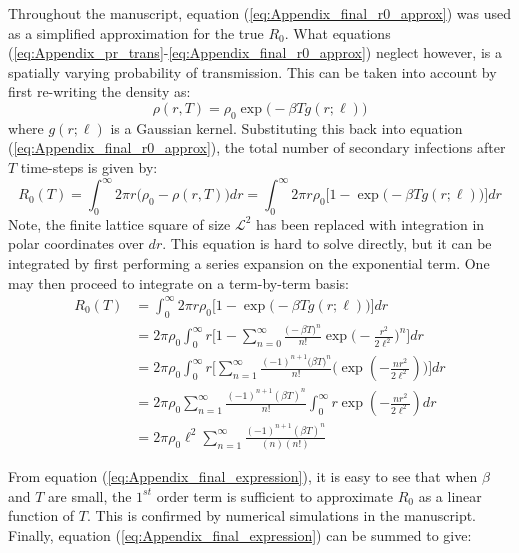 \begin{fi}
Throughout the manuscript, equation (\ref{eq:Appendix_final_r0_approx}) was used as a simplified approximation for the true $R_0$. What equations (\ref{eq:Appendix_pr_trans}-\ref{eq:Appendix_final_r0_approx}) neglect however, is a spatially varying probability of transmission. This can be taken into account by first re-writing the density as:
\begin{equation}
    \rho(r, T) = \rho_0\exp \big( -\beta T g(r; \ell) \big)
\end{equation}
where $g(r;\ell)$ is a Gaussian kernel. Substituting this back into equation (\ref{eq:Appendix_final_r0_approx}), the total number of secondary infections after $T$ time-steps is given by:
\begin{equation}
   R_0(T) = \int ^\infty _0 2\pi r \big (\rho_0 - \rho(r, T)\big)dr =  \int ^\infty _0 2\pi r \rho_0 \Big[1 - \exp\big(-\beta T g(r;\ell)\big) \Big]dr
\end{equation}
Note, the finite lattice square of size $\mathcal{L}^2$ has been replaced with integration in polar coordinates over $dr$. This equation is hard to solve directly, but it can be integrated by first performing a series expansion on the exponential term. One may then proceed to integrate on a term-by-term basis:
\begin{equation} \label{eq:Appendix_final_expression}
\begin{split}
R_0(T) & = \int^\infty_0 2\pi r \rho_0 \Big[1 - \exp \big( -\beta T g(r;\ell)\big)\Big]dr \\
& = 2\pi\rho_0 \int^\infty _0 r \Big[1 - \sum^\infty_{n=0} \frac{\big(-\beta T)^n}{n!} \exp\big(-\frac{r^2}{2\ell^2}\big)^n  \Big] dr \\
& = 2\pi\rho_0 \int^\infty _0 r \Big[\sum^\infty_{n=1} \frac{(-1)^{n+1}\big(\beta T)^n}{n!} \Big(\exp(-\frac{n r^2}{2\ell^2} ) \Big)  \Big] dr \\
& = 2\pi\rho_0 \sum^{\infty}_{n=1} \frac{(-1)^{n+1} (\beta T)^n}{n!} \int^\infty _0 r \exp(-\frac{n r^2}{2\ell^2})dr  \\
& = 2\pi\rho_0 \ell^2 \sum^{\infty}_{n=1} \frac{(-1)^{n+1}(\beta T)^n}{(n)(n!) }
\end{split}
\end{equation}

From equation (\ref{eq:Appendix_final_expression}), it is easy to see that when $\beta$ and $T$ are small, the $1^{st}$ order term is sufficient to approximate $R_0$ as a linear function of $T$. This is confirmed by numerical simulations in the manuscript. Finally, equation (\ref{eq:Appendix_final_expression}) can be summed to give:


\end{fi}
